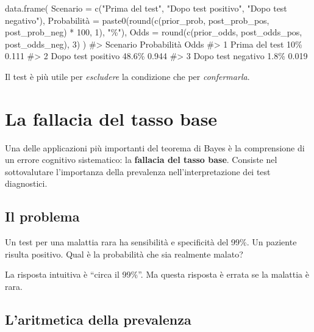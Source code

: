 \documentclass[
  italian,
  letterpaper,
  a4paper,
  11pt,
  open=any]{scrbook}
\newenvironment{Shaded}{\begin{snugshade}}{\end{snugshade}}
\newcommand{\AttributeTok}[1]{\textcolor[rgb]{0.40,0.45,0.13}{#1}}
\newcommand{\CommentTok}[1]{\textcolor[rgb]{0.37,0.37,0.37}{#1}}
\newcommand{\DecValTok}[1]{\textcolor[rgb]{0.68,0.00,0.00}{#1}}
\newcommand{\FunctionTok}[1]{\textcolor[rgb]{0.28,0.35,0.67}{#1}}
\newcommand{\NormalTok}[1]{\textcolor[rgb]{0.00,0.23,0.31}{#1}}
\newcommand{\OtherTok}[1]{\textcolor[rgb]{0.00,0.23,0.31}{#1}}
\newcommand{\SpecialCharTok}[1]{\textcolor[rgb]{0.37,0.37,0.37}{#1}}
\newcommand{\StringTok}[1]{\textcolor[rgb]{0.13,0.47,0.30}{#1}}
\theoremstyle{plain}
\theoremstyle{definition}
\theoremstyle{definition}
\theoremstyle{remark}
\begin{document}
\begin{tcolorbox}
\begin{Shaded}
\begin{Highlighting}[]
\FunctionTok{data.frame}\NormalTok{(}
  \AttributeTok{Scenario =} \FunctionTok{c}\NormalTok{(}\StringTok{"Prima del test"}\NormalTok{, }\StringTok{"Dopo test positivo"}\NormalTok{, }\StringTok{"Dopo test negativo"}\NormalTok{),}
\NormalTok{  Probabilità }\OtherTok{=} \FunctionTok{paste0}\NormalTok{(}\FunctionTok{round}\NormalTok{(}\FunctionTok{c}\NormalTok{(prior\_prob, post\_prob\_pos, post\_prob\_neg) }\SpecialCharTok{*} \DecValTok{100}\NormalTok{, }\DecValTok{1}\NormalTok{), }\StringTok{"\%"}\NormalTok{),}
  \AttributeTok{Odds =} \FunctionTok{round}\NormalTok{(}\FunctionTok{c}\NormalTok{(prior\_odds, post\_odds\_pos, post\_odds\_neg), }\DecValTok{3}\NormalTok{)}
\NormalTok{)}
\CommentTok{\#\textgreater{}             Scenario Probabilità  Odds}
\CommentTok{\#\textgreater{} 1     Prima del test         10\% 0.111}
\CommentTok{\#\textgreater{} 2 Dopo test positivo       48.6\% 0.944}
\CommentTok{\#\textgreater{} 3 Dopo test negativo        1.8\% 0.019}
\end{Highlighting}
\end{Shaded}

Il test è più utile per \emph{escludere} la condizione che per
\emph{confermarla}.

\end{tcolorbox}

\section{La fallacia del tasso base}\label{sec-base-rate-fallacy}

Una delle applicazioni più importanti del teorema di Bayes è la
comprensione di un errore cognitivo sistematico: la \textbf{fallacia del
tasso base}. Consiste nel sottovalutare l'importanza della prevalenza
nell'interpretazione dei test diagnostici.

\subsection{Il problema}\label{il-problema}

Un test per una malattia rara ha sensibilità e specificità del 99\%. Un
paziente risulta positivo. Qual è la probabilità che sia realmente
malato?

La risposta intuitiva è ``circa il 99\%''. Ma questa risposta è errata
se la malattia è rara.

\subsection{L'aritmetica della
prevalenza}\label{laritmetica-della-prevalenza}
\end{document}
